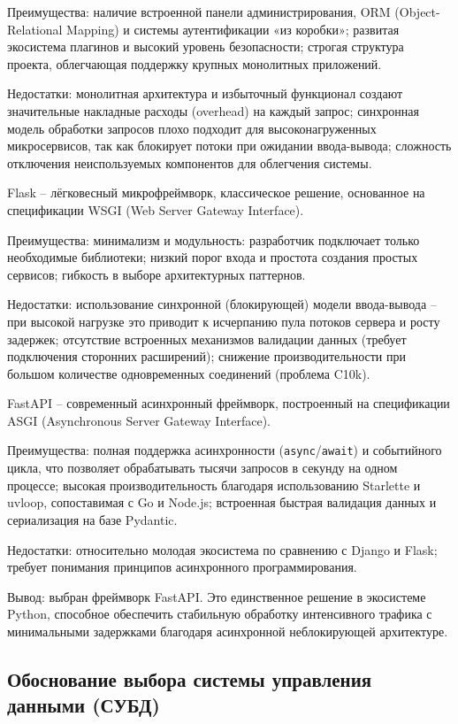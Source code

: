 Преимущества: наличие встроенной панели администрирования, ORM (Object-Relational Mapping) и системы аутентификации «из коробки»; развитая экосистема плагинов и высокий уровень безопасности; строгая структура проекта, облегчающая поддержку крупных монолитных приложений.

Недостатки: монолитная архитектура и избыточный функционал создают значительные накладные расходы (overhead) на каждый запрос; синхронная модель обработки запросов плохо подходит для высоконагруженных микросервисов, так как блокирует потоки при ожидании ввода-вывода; сложность отключения неиспользуемых компонентов для облегчения системы.

Flask -- лёгковесный микрофреймворк, классическое решение, основанное на спецификации WSGI (Web Server Gateway Interface).

Преимущества: минимализм и модульность: разработчик подключает только необходимые библиотеки; низкий порог входа и простота создания простых сервисов; гибкость в выборе архитектурных паттернов.

Недостатки: использование синхронной (блокирующей) модели ввода-вывода -- при высокой нагрузке это приводит к исчерпанию пула потоков сервера и росту задержек; отсутствие встроенных механизмов валидации данных (требует подключения сторонних расширений); снижение производительности при большом количестве одновременных соединений (проблема C10k).

FastAPI -- современный асинхронный фреймворк, построенный на спецификации ASGI (Asynchronous Server Gateway Interface).

Преимущества: полная поддержка асинхронности (\texttt{async}/\texttt{await}) и событийного цикла, что позволяет обрабатывать тысячи запросов в секунду на одном процессе; высокая производительность благодаря использованию Starlette и uvloop, сопоставимая с Go и Node.js; встроенная быстрая валидация данных и сериализация на базе Pydantic.

Недостатки: относительно молодая экосистема по сравнению с Django и Flask; требует понимания принципов асинхронного программирования.

Вывод: выбран фреймворк FastAPI. Это единственное решение в экосистеме Python, способное обеспечить стабильную обработку интенсивного трафика с минимальными задержками благодаря асинхронной неблокирующей архитектуре.

\subsection{Обоснование выбора системы управления данными (СУБД)}


